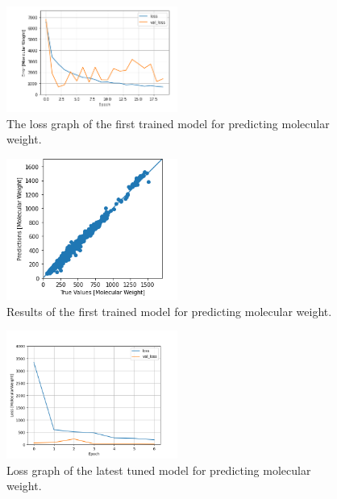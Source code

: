     \begin{figure}
        \centering
        \includegraphics[width=0.5\textwidth]{loss_gragh_20_epoch.PNG}
        \caption{The loss graph of the first trained model for predicting molecular weight.}
        \label{fig:model2-mol-weight-loss}
    \end{figure}
    \begin{figure}
        \centering
        \includegraphics[width=0.5\textwidth]{model_2_prediction.PNG}
        \caption{Results of the first trained model for predicting molecular weight.}
        \label{fig:model2-mol-weight-predictions}
    \end{figure}
    \begin{figure}
        \centering
        \includegraphics[width=0.5\textwidth]{model_20_7_epochs_loss_MolecularWeight.png}
        \caption{Loss graph of the latest tuned model for predicting molecular weight.}
        \label{fig:model20-mol-weight-loss}
    \end{figure}
